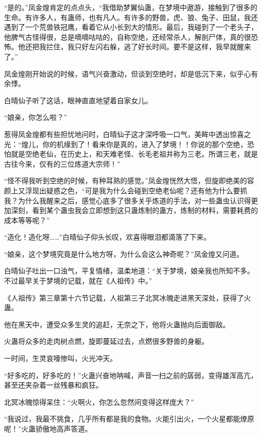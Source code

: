 
\begin{this_body}

“是的。”凤金煌肯定的点点头，“我借助梦翼仙蛊，在梦境中遨游，接触到了很多的生命。有许多人，有蛊师，也有凡人。有许多的野兽，虎、狼、兔子、田鼠，我还遇到了一个荒兽铁冠鹰，看着它从小长到大的情形。最后，我碰到了一个老头子，他脾气古怪得很，总是嘀嘀咕咕的，自称空绝，还经常杀人，解剖尸体，真的很恐怖。他还把我拦住，我只好左闪右躲，逃了好长时间。要不是这样，我早就醒来了。”

凤金煌刚开始说的时候，语气兴奋激动，但谈到空绝时，却是低沉下来，似乎心有余悸。

白晴仙子听了这话，眼神直直地望着自家女儿。

“娘亲，你怎么啦？”

惹得凤金煌都有些担忧地问时，白晴仙子这才深呼吸一口气，美眸中透出惊喜之光：“煌儿，你的机缘到了！看来你是真的，进入了梦境！！你说的那个空绝，恐怕就是空绝老仙，在历史上，和天难老怪、长毛老祖并称为三老。所谓三老，就是古往今来，仅有的三位炼道大宗师！”

“怪不得我听到空绝的时候，有种耳熟的感觉。”凤金煌恍然大悟，但旋即绝美的容颜上又浮现出疑惑之色，“可是我为什么会碰到空绝老仙呢？还有他为什么要抓我？为什么我醒来之后，感觉心底多了很多关乎炼道的手法，对一些蛊虫认识得更加深刻，看到某个蛊虫我会立即想到这只蛊炼制的蛊方，炼制的材料，需要耗费的成本等等呢？”

“造化！造化呀……”白晴仙子仰头长叹，欢喜得眼泪都滴落了下来。

“娘亲，这个梦境究竟是什么地方呀，为什么会这么神奇呢？”凤金煌又问道。

白晴仙子吐出一口浊气，平复情绪，温柔地道：“关于梦境，娘亲我也所知不多。不过最早关于梦境的记载，就在《人祖传》中。”

《人祖传》第三章第十六节记载，人祖第三子北冥冰魄走进黑天深处，获得了火蛊。

他在黑天中，遭受众多生灵的追赶，无奈之下，他将火蛊抛向后面御敌。

火蛊将众多的走肉树点燃，旋即蔓延过去，点燃很多野兽的身躯。

一时间，生灵哀嚎惨叫，火光冲天。

“好多吃的，好多吃的！”火蛊兴奋地呐喊，声音一扫之前的孱弱，变得雄浑高亢，甚至还夹杂着一丝残暴和疯狂。

北冥冰魄惊得呆住：“火啊火，你怎么忽然间变得这样庞大？”

“我说过，我最不挑食，几乎所有都是我的食物。火能引出火，一个火星都能燎原呢！”火蛊骄傲地高声答道。


\end{this_body}
